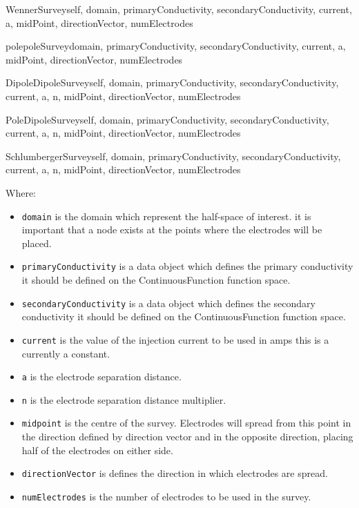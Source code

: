 \begin{classdesc}{WennerSurvey}{self, domain, primaryConductivity, secondaryConductivity,
current, a, midPoint, directionVector, numElectrodes}
\end{classdesc}

\begin{classdesc}{polepoleSurvey}{domain, primaryConductivity, secondaryConductivity, 
current, a, midPoint, directionVector, numElectrodes}
\end{classdesc}

\begin{classdesc}{DipoleDipoleSurvey}{self, domain, primaryConductivity, secondaryConductivity,
current, a, n, midPoint, directionVector, numElectrodes}
\end{classdesc}

\begin{classdesc}{PoleDipoleSurvey}{self, domain, primaryConductivity, secondaryConductivity,
current, a, n, midPoint, directionVector, numElectrodes}
\end{classdesc}

\begin{classdesc}{SchlumbergerSurvey}{self, domain, primaryConductivity, secondaryConductivity,
current, a, n, midPoint, directionVector, numElectrodes}
\end{classdesc}

\noindent Where:
\begin{itemize}
\item \texttt{domain} is the domain which represent the half-space of interest. 
it is important that a node exists at the points where the electrodes will be placed.
\item \texttt{primaryConductivity} is a data object which defines the primary conductivity
it should be defined on the ContinuousFunction function space.
\item \texttt{secondaryConductivity} is a data object which defines the secondary conductivity
it should be defined on the ContinuousFunction function space.
\item \texttt{current} is the value of the injection current to be used in amps this is a currently a
constant.
\item \texttt{a} is the electrode separation distance.
\item \texttt{n} is the electrode separation distance multiplier.
\item \texttt{midpoint} is the centre of the survey. Electrodes will spread from this point
in the direction defined by direction vector and in the opposite direction, placing
half of the electrodes on either side.
\item \texttt{directionVector} is defines the direction in which electrodes are spread.
\item \texttt{numElectrodes} is the number of electrodes to be used in the survey.
\end{itemize} 

